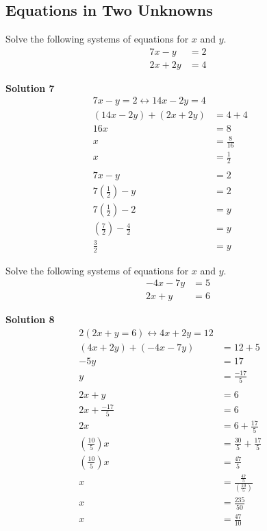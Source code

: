 \subsection{Equations in Two Unknowns}
\begin{tcolorbox}[title=Problem 7, breakable]
    Solve the following systems of equations for $x$ and $y$.
    \begin{align*}
        7x - y &= 2 \\
        2x + 2y &= 4
    \end{align*}
\end{tcolorbox}

\textbf{Solution 7}
\begin{align*}
    7x - y = 2 \leftrightarrow 14x - 2y = 4 && \\
    (14x - 2y) + (2x + 2y) &= 4 + 4 && \\
    16x &= 8 && \\
    x &= \frac{8}{16} && \\
    x &= \frac{1}{2} && \\ \\
    7x - y &= 2 && \\
    7(\frac{1}{2}) - y &= 2 && \\
    7(\frac{1}{2}) - 2 &= y && \\
    (\frac{7}{2}) - \frac{4}{2} &= y && \\
    \frac{3}{2} &= y
\end{align*}

\begin{tcolorbox}[title=Problem 8, breakable]
    Solve the following systems of equations for $x$ and $y$.
    \begin{align*}
        -4x - 7y &= 5 \\
        2x + y &= 6
    \end{align*}
\end{tcolorbox}

\textbf{Solution 8}
\begin{align*}
    2(2x + y = 6) \leftrightarrow 4x + 2y = 12 && \\
    (4x + 2y) + (-4x - 7y) &= 12 + 5 && \\
    -5y &= 17 && \\
    y &= \frac{-17}{5} && \\ \\
    2x + y &= 6 && \\
    2x + \frac{-17}{5} &= 6 && \\
    2x &= 6  + \frac{17}{5} && \\
    (\frac{10}{5})x &= \frac{30}{5}  + \frac{17}{5} && \\
    (\frac{10}{5})x &= \frac{47}{5} && \\
    x &= \frac{\frac{47}{5}}{(\frac{10}{5})} && \\
    x &= \frac{235}{50} && \\
    x &= \frac{47}{10} && \\
\end{align*}

